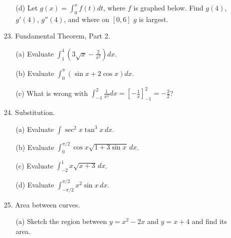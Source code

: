 \documentclass[12pt]{article}
\newcommand\parens[1]{\left( #1 \right)}
\newcommand\brac[1]{\left[ #1 \right]}
\begin{document}
\begin{enumerate}
\begin{enumerate}
\item[(d)] Let $g(x) = \int_0^x f(t) dt$, where $f$ is graphed below. Find $g(4)$, $g'(4)$, $g''(4)$, and where on $[0,6]$ $g$ is largest.
\begin{center}
\end{center}
\end{enumerate}
\item[23.] Fundamental Theorem, Part 2.
\begin{enumerate}
\item[(a)] Evaluate $\int_1^4 \parens{3\sqrt{x} - \frac{2}{x^2}} dx$.
\item[(b)] Evaluate $\int_0^{\pi} (\sin x + 2\cos x) dx$.
\item[(c)] What is wrong with $\int_{-1}^2 \frac{1}{x^2} dx = \brac{-\frac{1}{x}}_{-1}^2 = -\frac{3}{2}$?
\end{enumerate}
\item[24.] Substitution.
\begin{enumerate}
\item[(a)] Evaluate $\int \sec^2 x \tan^3 x\, dx$.
\item[(b)] Evaluate $\int_0^{\pi/2} \cos x\sqrt{1 + 3\sin x}\, dx$.
\item[(c)] Evaluate $\int_{-2}^1 x\sqrt{x+3}\, dx$.
\item[(d)] Evaluate $\int_{-\pi/2}^{\pi/2} x^2 \sin x\, dx$.
\end{enumerate}
\item[25.] Area between curves.
\begin{enumerate}
\item[(a)] Sketch the region between $y = x^2 - 2x$ and $y = x + 4$ and find its area.
\begin{center}
\end{center}
\end{enumerate}
\end{enumerate}
\end{document}

